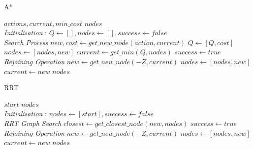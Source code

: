 \documentclass{IEEEtran}
\begin{document}
 \begin{algorithm}
 \caption{A*}
 \begin{algorithmic}[1]
 \renewcommand{\algorithmicrequire}{\textbf{Input:}}
 \renewcommand{\algorithmicensure}{\textbf{Output:}}
 \REQUIRE $actions, current, min\_cost$
 \ENSURE  $nodes$
 \\ \textit{Initialisation} :
 \STATE $Q\gets [], nodes\gets [], success\gets false$
 \\ \textit{Search Process}
  \STATE $new, cost \gets get\_new\_node(action, current)$
  \STATE $Q \gets [Q,cost]$
  \STATE $nodes \gets [nodes,new]$
  \ENDIF
  \ENDFOR
  \STATE $current \gets get\_min(Q,nodes)$
  \STATE $success \gets true$
  \ENDIF
  \ENDWHILE
 \\ \textit{Rejoining Operation}
  \STATE $new \gets get\_new\_node(-Z, current)$
  \STATE $nodes \gets [nodes,new]$
  \STATE $current \gets new$
  \ENDWHILE
 \RETURN $nodes$ 
 \end{algorithmic} 
 \end{algorithm}

 \begin{algorithm}
 \caption{RRT}
 \begin{algorithmic}[1]
 \renewcommand{\algorithmicrequire}{\textbf{Input:}}
 \renewcommand{\algorithmicensure}{\textbf{Output:}}
 \REQUIRE $start$
 \ENSURE  $nodes$
 \\ \textit{Initialisation} :
  \STATE $nodes \gets [start], success \gets false$
 \\ \textit{RRT Graph Search}
  \ENDWHILE
  \STATE $closest \gets get\_closest\_node(new, nodes)$
  \STATE $success \gets true$
  \ENDIF
  \ENDIF
  \ENDFOR
  \ENDWHILE
 \\ \textit{Rejoining Operation}
  \STATE $new \gets get\_new\_node(-Z, current)$
  \STATE $nodes \gets [nodes,new]$
  \STATE $current \gets new$
  \ENDWHILE
 \RETURN $nodes$ 
 \end{algorithmic} 
 \end{algorithm}
\end{document}
